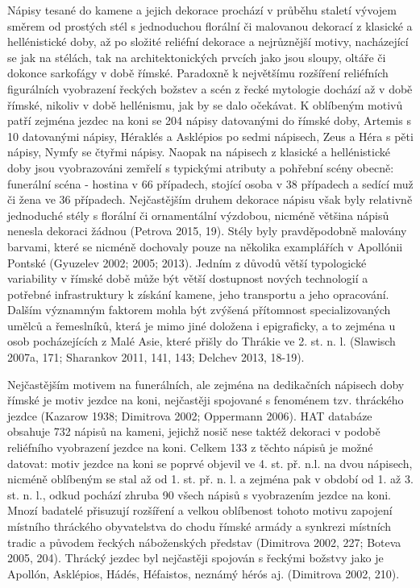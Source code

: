 Nápisy tesané do kamene a jejich dekorace prochází v průběhu staletí vývojem směrem od prostých stél s jednoduchou florální či malovanou dekorací z klasické a hellénistické doby, až po složité reliéfní dekorace a nejrůznější motivy, nacházející se jak na stélách, tak na architektonických prvcích jako jsou sloupy, oltáře či dokonce sarkofágy v době římské. Paradoxně k největšímu rozšíření reliéfních figurálních vyobrazení řeckých božstev a scén z řecké mytologie dochází až v době římské, nikoliv v době hellénismu, jak by se dalo očekávat. K oblíbeným motivů patří zejména jezdec na koni se 204 nápisy datovanými do římské doby, Artemis s 10 datovanými nápisy, Héraklés a Asklépios po sedmi nápisech, Zeus a Héra s pěti nápisy, Nymfy se čtyřmi nápisy. Naopak na nápisech z klasické a hellénistické doby jsou vyobrazováni zemřelí s typickými atributy a pohřební scény obecně: funerální scéna - hostina v 66 případech, stojící osoba v 38 případech a sedící muž či žena ve 36 případech. Nejčastějším druhem dekorace nápisu však byly relativně jednoduché stély s florální či ornamentální výzdobou, nicméně většina nápisů nenesla dekoraci žádnou (Petrova 2015, 19). Stély byly pravděpodobně malovány barvami, které se nicméně dochovaly pouze na několika examplářích v Apollónii Pontské (Gyuzelev 2002; 2005; 2013). Jedním z důvodů větší typologické variability v římské době může být větší dostupnost nových technologií a potřebné infrastruktury k získání kamene, jeho transportu a jeho opracování. Dalším významným faktorem mohla být zvýšená přítomnost specializovaných umělců a řemeslníků, která je mimo jiné doložena i epigraficky, a to zejména u osob pocházejících z Malé Asie, které přišly do Thrákie ve 2. st. n. l. (Slawisch 2007a, 171; Sharankov 2011, 141, 143; Delchev 2013, 18-19).

Nejčastějším motivem na funerálních, ale zejména na dedikačních nápisech doby římské je motiv jezdce na koni, nejčastěji spojované s fenoménem tzv. thráckého jezdce (Kazarow 1938; Dimitrova 2002; Oppermann 2006). HAT databáze obsahuje 732 nápisů na kameni, jejichž nosič nese taktéž dekoraci v podobě reliéfního vyobrazení jezdce na koni. Celkem 133 z těchto nápisů je možné datovat: motiv jezdce na koni se poprvé objevil ve 4. st. př. n.l. na dvou nápisech, nicméně oblíbeným se stal až od 1. st. př. n. l. a zejména pak v období od 1. až 3. st. n. l., odkud pochází zhruba 90  všech nápisů s vyobrazením jezdce na koni. Mnozí badatelé přisuzují rozšíření a velkou oblíbenost tohoto motivu zapojení místního thráckého obyvatelstva do chodu římské armády a synkrezi místních tradic a původem řeckých náboženských představ (Dimitrova 2002, 227; Boteva 2005, 204). Thrácký jezdec byl nejčastěji spojován s řeckými božstvy jako je Apollón, Asklépios, Hádés, Héfaistos, neznámý hérós aj. (Dimitrova 2002, 210).

